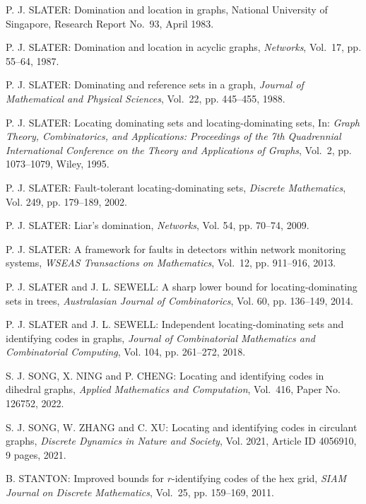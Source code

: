 \begin{thebibliography}{999}
P. J. SLATER: Domination and location in graphs, National University of Singapore, Research Report No.~93, April 1983.

P. J. SLATER: Domination and location in acyclic graphs, {\it Networks}, Vol.~17, pp. 55--64, 1987.

P. J. SLATER: Dominating and reference sets in a graph, {\it Journal of Mathematical and Physical Sciences}, Vol.~22, pp. 445--455, 1988.

P. J. SLATER: Locating dominating sets and locating-dominating sets, In: {\it Graph Theory, Combinatorics, and Applications: Proceedings of the 7th Quadrennial International Conference on the Theory and Applications of Graphs}, Vol.~2, pp. 1073--1079, Wiley, 1995.

P. J. SLATER: Fault-tolerant locating-dominating sets, {\it Discrete Mathematics}, Vol. 249, pp. 179--189, 2002.

P. J. SLATER: Liar's domination, {\it Networks}, Vol. 54, pp. 70--74, 2009.

P. J. SLATER: A framework for faults in detectors within network monitoring systems, {\it WSEAS Transactions on Mathematics}, Vol.~12, pp. 911--916, 2013.

P. J. SLATER and J. L. SEWELL: A sharp lower bound for locating-dominating sets in trees, {\it Australasian Journal of Combinatorics}, Vol. 60, pp. 136--149, 2014.

P. J. SLATER and J. L. SEWELL: Independent locating-dominating sets and identifying codes in graphs, {\it Journal of Combinatorial Mathematics and Combinatorial Computing}, Vol. 104, pp. 261--272, 2018.

S. J. SONG, X. NING and P. CHENG: Locating and identifying codes in dihedral graphs, {\it Applied Mathematics and Computation}, Vol.~416, Paper No. 126752, 2022.

S. J. SONG, W. ZHANG and C. XU: Locating and identifying codes in circulant graphs, {\it Discrete Dynamics in Nature and Society}, Vol. 2021, Article ID 4056910, 9 pages, 2021.

B. STANTON: Improved bounds for $r$-identifying codes of the hex grid, {\it SIAM Journal on Discrete Mathematics}, Vol.~25, pp. 159--169, 2011.


\end{thebibliography}
